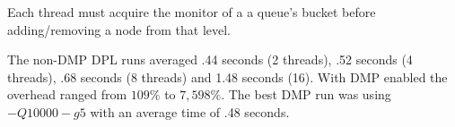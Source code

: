 Each thread must acquire the monitor of a a queue's bucket before
adding/removing a node from that level.

The non-DMP DPL runs averaged .44 seconds (2 threads), .52 seconds (4
threads), .68 seconds (8 threads) and 1.48 seconds (16).  With DMP
enabled the overhead ranged from $109\%$ to $7,598\%$.  The best DMP
run was using $-Q10000 -g5$ with an average time of .48 seconds.

